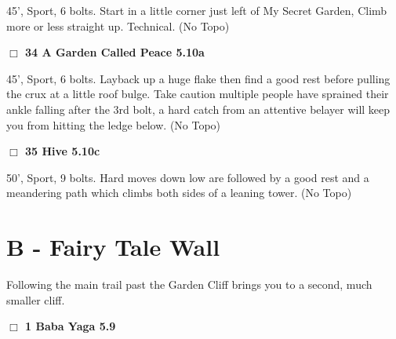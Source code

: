 \begin{multicols}{2}
\begin{adjustwidth}{1.3em}{}
45', Sport, 6 bolts. Start in a little corner just left of My Secret Garden, Climb more or less straight up. Technical.
  (No Topo)
\end{adjustwidth}




\needspace{2em}
\label{rt:A Garden Called Peace}
\colorbox{RoyalBlue!20}{
\parbox{0.95\linewidth}{
\hspace{-1ex}\textbf{$\Box$
34 A Garden Called Peace 5.10a  
}}}
\begin{adjustwidth}{1.3em}{}			

45', Sport, 6 bolts. Layback up a huge flake then find a good rest before pulling the crux at a little roof bulge. Take caution multiple people have sprained their ankle falling after the 3rd bolt, a hard catch from an attentive belayer will keep you from hitting the ledge below.
  (No Topo)
\end{adjustwidth}




\needspace{2em}
\label{rt:Hive}
\colorbox{RoyalBlue!20}{
\parbox{0.95\linewidth}{
\hspace{-1ex}\textbf{$\Box$
35 Hive 5.10c  
}}}
\begin{adjustwidth}{1.3em}{}			

50', Sport, 9 bolts. Hard moves down low are followed by a good rest and a meandering path which climbs both sides of a leaning tower.
  (No Topo)
\end{adjustwidth}







\newpage

\section{B - Fairy Tale Wall}\label{sa:Fairy Tale Wall}

Following the main trail past the Garden Cliff brings you to a second, much smaller cliff.\\




\needspace{10em}




\needspace{2em}
\label{rt:Baba Yaga}
\colorbox{green!20}{
\parbox{0.95\linewidth}{
\hspace{-1ex}\textbf{$\Box$
1 Baba Yaga 5.9  
}}}
\begin{adjustwidth}{1.3em}{}			


\end{adjustwidth}
\end{multicols}
